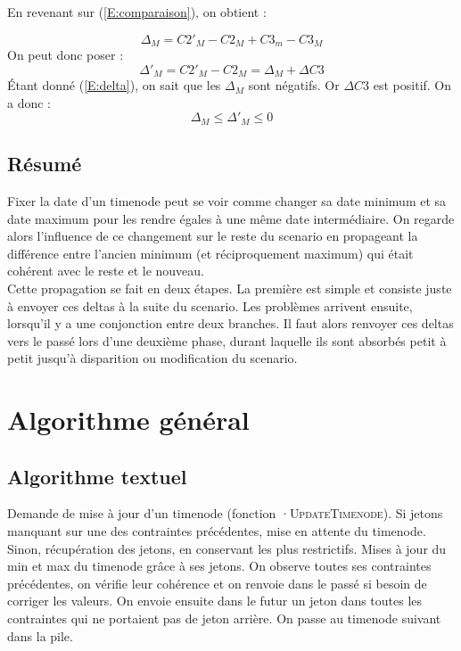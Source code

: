 \documentclass[10pt,a4paper]{article}
\begin{document}
En revenant sur (\ref{E:comparaison}), on obtient :

	\begin{equation}
		\Delta{}_M = C2'_M - C2_M + C3_m - C3_M \nonumber
	\end{equation}
On peut donc poser : 
	\begin{equation}
		\Delta{'}_M = C2'_M - C2_M = \Delta{}_M + \Delta{C3} 
	\end{equation}
Étant donné (\ref{E:delta}), on sait que les $\Delta{}_M$ sont négatifs. Or $\Delta{C3}$ est positif. On a donc : 
	\begin{equation}
		\Delta{}_M  \leq \Delta{'}_M  \leq 0
	\end{equation}

	\subsection{Résumé}

Fixer la date d'un timenode peut se voir comme changer sa date minimum et sa date maximum pour les rendre égales à une même date intermédiaire. On regarde alors l'influence de ce changement sur le reste du scenario en propageant la différence entre l'ancien minimum (et réciproquement maximum) qui était cohérent avec le reste et le nouveau. \\

Cette propagation se fait en deux étapes. La première est simple et consiste juste à envoyer ces deltas à la suite du scenario. Les problèmes arrivent ensuite, lorsqu'il y a une conjonction entre deux branches. Il faut alors renvoyer ces deltas vers le passé lors d'une deuxième phase, durant laquelle ils sont absorbés petit à petit jusqu'à disparition ou modification du scenario.

\section{Algorithme général}
	\subsection{Algorithme textuel}
\label{section:exec}
Demande de mise à jour d'un timenode (fonction ·\textsc{UpdateTimenode}). Si jetons manquant sur une des contraintes précédentes, mise en attente du timenode. Sinon, récupération des jetons, en conservant les plus restrictifs. Mises à jour du min et max du timenode grâce à ses jetons. On observe toutes ses contraintes précédentes, on vérifie leur cohérence et on renvoie dans le passé si besoin de corriger les valeurs. On envoie ensuite dans le futur un jeton dans toutes les contraintes qui ne portaient pas de jeton arrière. On passe au timenode suivant dans la pile. \\
\end{document}
